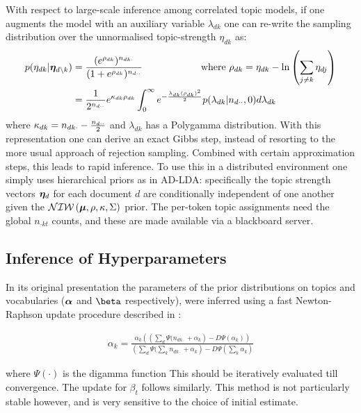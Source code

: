 With respect to large-scale inference among correlated topic models, if one augments the model with an auxiliary variable $\lambda_{dk}$ one can re-write the sampling distribution over the unnormalised topic-strength $\eta_{dk}$ as:
\begin{align}
p(\eta_{dk} | \bm \eta_{d\setminus k}) & = \frac{(e^{\rho_{dk}})^{n_{dk\cdot}}}{(1 + e^{\rho_{dk}})^{n_{d\cdot\cdot}}} \qquad\qquad\qquad\text{where }\rho_{dk} = \eta_{dk} - \ln\left(\sum_{j \neq k} \eta_{dj}\right) \\
&= \frac{1}{2^{n_{d\cdot\cdot}}}
e^{\kappa_{dk} \rho_{dk}}
\int_0^\infty e^{-\frac{\lambda_{dk} (\rho_{dk})^2}{2}} p(\lambda_{dk}|n_{d\cdot\cdot},0) d\lambda_{dk} 
\end{align}
where $\kappa_{dk} = n_{dk\cdot} - \frac{n_{d\cdot\cdot}}{2}$ and $\lambda_{dk}$ has a Polygamma distribution. With this representation one can derive an exact Gibbs step, instead of resorting to the more usual approach of rejection sampling. Combined with certain approximation steps, this leads to rapid inference\cite{Chen2013}. To use this in a distributed environment one simply uses hierarchical priors as in AD-LDA: specifically the topic strength vectors $\bm \eta_d$ for each document $d$ are conditionally independent of one another given the $\mathcal{NIW}\left(\bm \mu, \rho, \kappa, \Sigma\right)$ prior. The per-token topic assignments need the global $n_{\cdot k t}$ counts, and these are made available via a blackboard server.

\subsection*{Inference of Hyperparameters}
In its original presentation\cite{BleiNgJordan2003} the parameters of the prior distributions on topics and vocabularies ($\bm \alpha$ and $\vv{\beta}$ respectively), were inferred using a fast Newton-Raphson update procedure described in \cite{Minka2000}:

\begin{align}
\alpha_k = \frac{\alpha_k \left( \left(\sum_d \Psi(n_{dk\cdot} + \alpha_k \right) - D \Psi (\alpha_k)\right)}{\left(\sum_d  \Psi(\sum_k n_{dk\cdot} + \alpha_k \right) - D \Psi (\sum_k \alpha_k)}
\end{align}

where $\Psi(\cdot)$ is the digamma function This should be iteratively evaluated till convergence. The update for $\beta_t$ follows similarly. This method is not particularly stable however, and is very sensitive to the choice of initial estimate.

